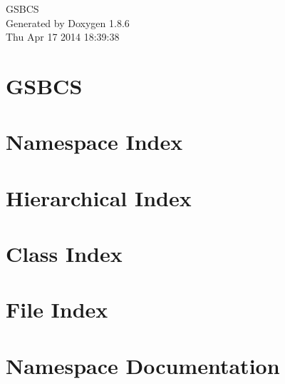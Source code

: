 \documentclass[twoside]{book}
\newcommand{\clearemptydoublepage}{%
  \newpage{\pagestyle{empty}\cleardoublepage}%
}
\begin{document}
\hypersetup{pageanchor=false}
\begin{titlepage}
\vspace*{7cm}
\begin{center}%
{\Large G\-S\-B\-C\-S }\\
\vspace*{1cm}
{\large Generated by Doxygen 1.8.6}\\
\vspace*{0.5cm}
{\small Thu Apr 17 2014 18:39:38}\\
\end{center}
\end{titlepage}
\clearemptydoublepage
\tableofcontents
\clearemptydoublepage
{}
\hypersetup{pageanchor=true}

\chapter{G\-S\-B\-C\-S}
\label{md__c_1__users_dju__documents__visual__studio_2012__projects__p_p_e__p_p_e3__r_e_a_d_m_e}
\hypertarget{md__c_1__users_dju__documents__visual__studio_2012__projects__p_p_e__p_p_e3__r_e_a_d_m_e}{}

\chapter{Namespace Index}

\chapter{Hierarchical Index}

\chapter{Class Index}

\chapter{File Index}

\chapter{Namespace Documentation}











\end{document}
